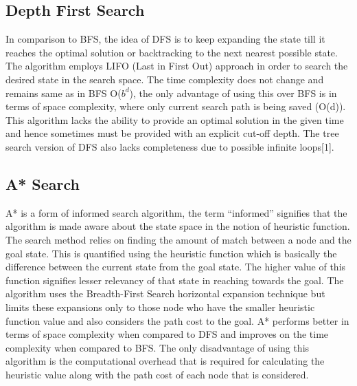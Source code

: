 \documentclass{svproc}
\begin{document}
\subsection{Depth First Search}
In comparison to BFS, the idea of DFS is to keep expanding the state till it reaches the optimal solution or backtracking to the next nearest possible state. The algorithm employs LIFO (Last in First Out) approach in order to search the desired state in the search space. The time complexity does not change and remains same as in BFS O($b^{d}$), the only advantage of using this over BFS is in terms of space complexity, where only current search path is being saved (O(d)). This algorithm lacks the ability to provide an optimal solution in the given time and hence sometimes must be provided with an explicit cut-off depth.  The tree search version of DFS also lacks completeness due to possible infinite loops[1].

\subsection{A* Search }
A* is a form of informed search algorithm, the term “informed” signifies that the algorithm is made aware about the state space in the notion of heuristic function. The search method relies on finding the amount of match between a node and the goal state. This is quantified using the heuristic function which is basically the difference between the current state from the goal state. The higher value of this function signifies lesser relevancy of that state in reaching towards the goal. The algorithm uses the Breadth-First Search horizontal expansion technique but limits these expansions only to those node who have the smaller heuristic function value and also considers the path cost to the goal. A* performs better in terms of space complexity when compared to DFS  and  improves on the time complexity  when compared to BFS. The only disadvantage of using this algorithm is the computational overhead that is required for calculating the heuristic value along with the path cost of each node that is considered.
\end{document}
